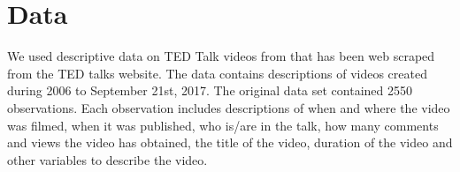 \section{Data}
We used descriptive data on TED Talk videos from that has been web scraped from the TED talks website. The data contains descriptions of videos created during 2006 to September 21st, 2017. The original data set contained 2550 observations. Each observation includes descriptions of when and where the video was filmed, when it was published, who is/are in the talk, how many comments and views the video has obtained, the title of the video, duration of the video and other variables to describe the video.